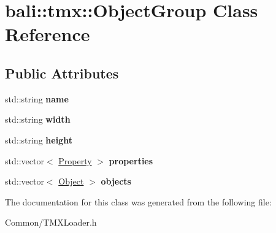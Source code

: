 \hypertarget{classbali_1_1tmx_1_1_object_group}{\section{bali\-:\-:tmx\-:\-:Object\-Group Class Reference}
\label{classbali_1_1tmx_1_1_object_group}
}
\subsection*{Public Attributes}
\begin{DoxyCompactItemize}
\item 
\hypertarget{classbali_1_1tmx_1_1_object_group_ab2cdb9b9aa4252348faae996be3d875e}{std\-::string {\bfseries name}}\label{classbali_1_1tmx_1_1_object_group_ab2cdb9b9aa4252348faae996be3d875e}

\item 
\hypertarget{classbali_1_1tmx_1_1_object_group_ad74132d0dcb43a74fafe15039b781681}{std\-::string {\bfseries width}}\label{classbali_1_1tmx_1_1_object_group_ad74132d0dcb43a74fafe15039b781681}

\item 
\hypertarget{classbali_1_1tmx_1_1_object_group_a26f4cab42234a6ddcf44c800c8300eb1}{std\-::string {\bfseries height}}\label{classbali_1_1tmx_1_1_object_group_a26f4cab42234a6ddcf44c800c8300eb1}

\item 
\hypertarget{classbali_1_1tmx_1_1_object_group_a28984db3b894490d20bb91dc6d79fdce}{std\-::vector$<$ \hyperlink{classbali_1_1tmx_1_1_property}{Property} $>$ {\bfseries properties}}\label{classbali_1_1tmx_1_1_object_group_a28984db3b894490d20bb91dc6d79fdce}

\item 
\hypertarget{classbali_1_1tmx_1_1_object_group_a4e39488e32fc67b38f9d38ac5a042964}{std\-::vector$<$ \hyperlink{classbali_1_1tmx_1_1_object}{Object} $>$ {\bfseries objects}}\label{classbali_1_1tmx_1_1_object_group_a4e39488e32fc67b38f9d38ac5a042964}

\end{DoxyCompactItemize}


The documentation for this class was generated from the following file\-:\begin{DoxyCompactItemize}
\item 
Common/T\-M\-X\-Loader.\-h\end{DoxyCompactItemize}
